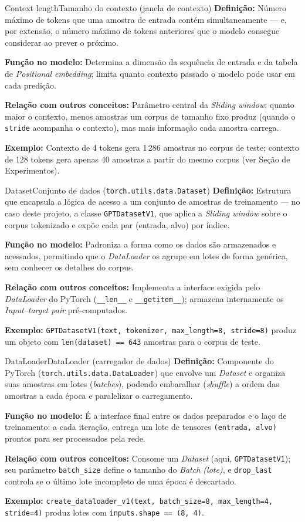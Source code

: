 \documentclass[11pt,a4paper]{article}
\newcommand{\campo}[2]{\textbf{\textcolor{accentblue}{#1:}} #2\par\smallskip}
\begin{document}
\begin{termo}{Context length}{Tamanho do contexto (janela de contexto)}
\campo{Definição}{Número máximo de tokens que uma amostra de entrada contém
simultaneamente --- e, por extensão, o número máximo de tokens anteriores que o modelo
consegue considerar ao prever o próximo.}
\campo{Função no modelo}{Determina a dimensão da sequência de entrada e da tabela de
\emph{Positional embedding}; limita quanto contexto passado o modelo pode usar em
cada predição.}
\campo{Relação com outros conceitos}{Parâmetro central da \emph{Sliding window};
quanto maior o contexto, menos amostras um corpus de tamanho fixo produz (quando o
\texttt{stride} acompanha o contexto), mas mais informação cada amostra carrega.}
\campo{Exemplo}{Contexto de 4 tokens gera 1\,286 amostras no corpus de teste; contexto
de 128 tokens gera apenas 40 amostras a partir do mesmo corpus (ver Seção de
Experimentos).}
\end{termo}

\begin{termo}{Dataset}{Conjunto de dados (\texttt{torch.utils.data.Dataset})}
\campo{Definição}{Estrutura que encapsula a lógica de acesso a um conjunto de amostras
de treinamento --- no caso deste projeto, a classe \texttt{GPTDatasetV1}, que aplica a
\emph{Sliding window} sobre o corpus tokenizado e expõe cada par (entrada, alvo)
por índice.}
\campo{Função no modelo}{Padroniza a forma como os dados são armazenados e acessados,
permitindo que o \emph{DataLoader} os agrupe em lotes de forma genérica, sem
conhecer os detalhes do corpus.}
\campo{Relação com outros conceitos}{Implementa a interface exigida pelo
\emph{DataLoader} do PyTorch (\texttt{\_\_len\_\_} e \texttt{\_\_getitem\_\_});
armazena internamente os \emph{Input--target pair} pré-computados.}
\campo{Exemplo}{\texttt{GPTDatasetV1(text, tokenizer, max\_length=8, stride=8)} produz
um objeto com \texttt{len(dataset) == 643} amostras para o corpus de teste.}
\end{termo}

\begin{termo}{DataLoader}{DataLoader (carregador de dados)}
\campo{Definição}{Componente do PyTorch (\texttt{torch.utils.data.DataLoader}) que
envolve um \emph{Dataset} e organiza suas amostras em lotes (\emph{batches}),
podendo embaralhar (\emph{shuffle}) a ordem das amostras a cada época e paralelizar o
carregamento.}
\campo{Função no modelo}{É a interface final entre os dados preparados e o laço de
treinamento: a cada iteração, entrega um lote de tensores \texttt{(entrada, alvo)}
prontos para ser processados pela rede.}
\campo{Relação com outros conceitos}{Consome um \emph{Dataset} (aqui,
\texttt{GPTDatasetV1}); seu parâmetro \texttt{batch\_size} define o tamanho do
\emph{Batch (lote)}, e \texttt{drop\_last} controla se o último lote incompleto de
uma época é descartado.}
\campo{Exemplo}{\texttt{create\_dataloader\_v1(text, batch\_size=8, max\_length=4,
stride=4)} produz lotes com \texttt{inputs.shape == (8, 4)}.}
\end{termo}
\end{document}
